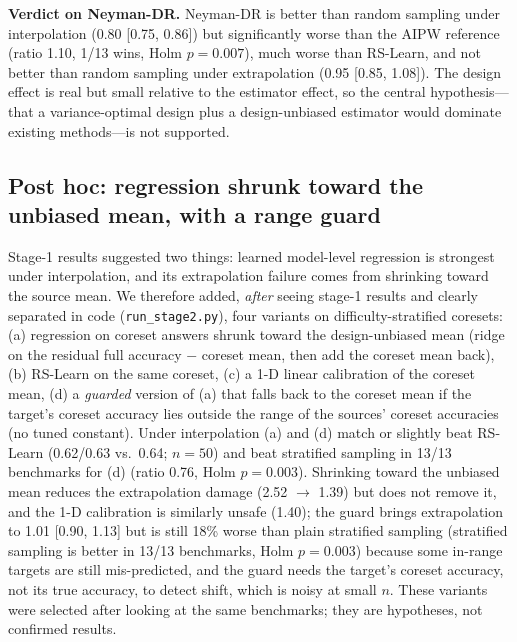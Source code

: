 \documentclass{article}
\begin{document}
\textbf{Verdict on Neyman-DR.}
Neyman-DR is better than random sampling under interpolation (0.80 [0.75, 0.86]) but significantly worse than the AIPW reference (ratio 1.10, 1/13 wins, Holm $p=0.007$), much worse than RS-Learn, and not better than random sampling under extrapolation (0.95 [0.85, 1.08]).
The design effect is real but small relative to the estimator effect, so the central hypothesis---that a variance-optimal design plus a design-unbiased estimator would dominate existing methods---is not supported.

\begin{table}[t]
\centering\small
\caption{Ablations of the proposed method at $n{=}50$, cross-fitted latent estimator, MAE ratio to random sampling [95\% CI]; seeds 0--9 only ($k{=}1,4$ were fitted only for these seeds), so intervals are wider than in Table~\ref{tab:main}.}
\label{tab:abl}
\setlength{\tabcolsep}{4pt}

\end{table}

\subsection{Post hoc: regression shrunk toward the unbiased mean, with a range guard}
\label{sec:posthoc}
Stage-1 results suggested two things: learned model-level regression is strongest under interpolation, and its extrapolation failure comes from shrinking toward the source mean.
We therefore added, \emph{after} seeing stage-1 results and clearly separated in code (\texttt{run\_stage2.py}), four variants on difficulty-stratified coresets: (a) regression on coreset answers shrunk toward the design-unbiased mean (ridge on the residual full accuracy $-$ coreset mean, then add the coreset mean back), (b) RS-Learn on the same coreset, (c) a 1-D linear calibration of the coreset mean, (d) a \emph{guarded} version of (a) that falls back to the coreset mean if the target's coreset accuracy lies outside the range of the sources' coreset accuracies (no tuned constant).
Under interpolation (a) and (d) match or slightly beat RS-Learn (0.62/0.63 vs.\ 0.64; $n{=}50$) and beat stratified sampling in 13/13 benchmarks for (d) (ratio 0.76, Holm $p=0.003$).
Shrinking toward the unbiased mean reduces the extrapolation damage (2.52 $\to$ 1.39) but does not remove it, and the 1-D calibration is similarly unsafe (1.40); the guard brings extrapolation to 1.01 [0.90, 1.13] but is still 18\% worse than plain stratified sampling (stratified sampling is better in 13/13 benchmarks, Holm $p=0.003$) because some in-range targets are still mis-predicted, and the guard needs the target's coreset accuracy, not its true accuracy, to detect shift, which is noisy at small $n$.
These variants were selected after looking at the same benchmarks; they are hypotheses, not confirmed results.
\end{document}
